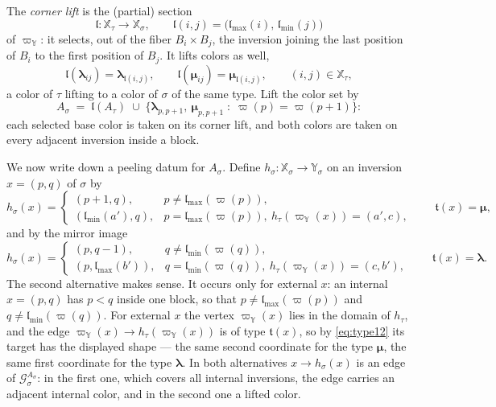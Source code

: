 \documentclass[12pt]{article}
\theoremstyle{definition}
\newcommand{\pset}{A}                  %
\newcommand{\typ}{\mathfrak{t}}
\newcommand{\XX}{\mathbb{X}}  %
\newcommand{\YY}{\mathbb{Y}}  %
\newcommand{\Gc}{\mathcal{G}}          %
\newcommand{\blam}{\boldsymbol{\lambda}}   %
\newcommand{\bmu}{\boldsymbol{\mu}}        %
\newcommand{\prj}{\varpi}                  %
\newcommand{\prjY}{\varpi_{\YY}}           %
\newcommand{\lmin}{\mathfrak{l}_{\min}}    %
\newcommand{\lmax}{\mathfrak{l}_{\max}}    %
\newcommand{\cl}{\mathfrak{l}}             %
\begin{document}
The \emph{corner lift} is the (partial) section
\begin{equation}\label{eq:cornerlift}
   \cl : \XX_\tau \longrightarrow \XX_\sigma,
   \qquad
   \cl(i,j) = \bigl(\lmax(i),\,\lmin(j)\bigr)
\end{equation}
of $\prjY$: it selects, out of the fiber $B_i\times B_j$, the inversion
joining the last position of $B_i$ to the first position of $B_j$. It
lifts colors as well,
\begin{equation}\label{eq:colorlift}
   \cl(\blam_{ij}) = \blam_{\cl(i,j)},
   \qquad
   \cl(\bmu_{ij}) = \bmu_{\cl(i,j)},
   \qquad (i,j) \in \XX_\tau ,
\end{equation}
a color of $\tau$ lifting to a color of $\sigma$ of the same type. Lift
the color set by
\begin{equation}\label{eq:liftedA}
   \pset_\sigma \;=\; \cl(\pset_\tau) \;\cup\;
   \bigl\{\blam_{p,p+1},\ \bmu_{p,p+1} \;:\; \prj(p) = \prj(p+1)\bigr\} :
\end{equation}
each selected base color is taken on its corner lift, and both colors are
taken on every adjacent inversion inside a block.

We now write down a peeling datum for $\pset_\sigma$. Define $h_\sigma :
\XX_\sigma \to \YY_\sigma$ on an inversion $x = (p,q)$ of $\sigma$ by
\begin{equation}\label{eq:hmu}
   h_\sigma(x) =
   \begin{cases}
      (p+1,q), & p \ne \lmax(\prj(p)),\\
      (\lmin(a'),q), & p = \lmax(\prj(p)),\ h_\tau(\prjY(x)) = (a',c),
   \end{cases}
   \qquad \typ(x) = \bmu ,
\end{equation}
and by the mirror image
\begin{equation}\label{eq:hlambda}
   h_\sigma(x) =
   \begin{cases}
      (p,q-1), & q \ne \lmin(\prj(q)),\\
      (p,\lmax(b')), & q = \lmin(\prj(q)),\ h_\tau(\prjY(x)) = (c,b'),
   \end{cases}
   \qquad \typ(x) = \blam .
\end{equation}
The second alternative makes sense. It occurs only for external $x$: an
internal $x = (p,q)$ has $p < q$ inside one block, so that $p \ne
\lmax(\prj(p))$ and $q \ne \lmin(\prj(q))$. For external $x$ the vertex
$\prjY(x)$ lies in the domain of $h_\tau$, and the edge $\prjY(x) \to
h_\tau(\prjY(x))$ is of type $\typ(x)$, so by \eqref{eq:type12} its target has
the displayed shape --- the same second coordinate for the type $\bmu$,
the same first coordinate for the type $\blam$. In both alternatives $x
\to h_\sigma(x)$ is an edge of $\Gc^{\pset_\sigma}_\sigma$: in the first one,
which covers all internal inversions, the edge carries an adjacent
internal color, and in the second one a lifted color.
\end{document}
